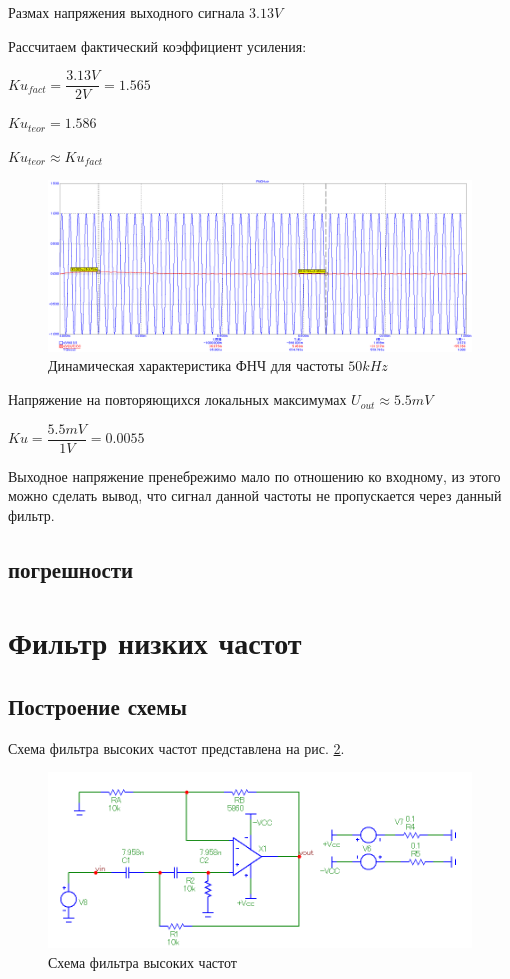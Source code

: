 \documentclass[a4paper,14pt]{article}
\begin{document}
Размах напряжения выходного сигнала $3.13V$

Рассчитаем фактический коэффициент усиления:

$Ku_{fact} = \dfrac{3.13V}{2V} = 1.565$

$Ku_{teor} = 1.586$

$Ku_{teor} \approx Ku_{fact}$

\begin{figure}[H]
	\centering
	\includegraphics[width=0.95\linewidth]{../imgs/FNCH/garm_50k_N}
	\caption{Динамическая характеристика ФНЧ для частоты $50kHz$}
	\label{fig:garm50kn}
\end{figure}

Напряжение на повторяющихся локальных максимумах $U_{out} \approx 5.5mV$

$Ku = \dfrac{5.5mV}{1V} = 0.0055$

Выходное напряжение пренебрежимо мало по отношению ко входному, из этого можно сделать вывод, что сигнал данной частоты не пропускается через данный фильтр.

\subsection{погрешности}




\section{Фильтр низких частот}

\subsection{Построение схемы}

Схема фильтра высоких частот представлена на рис. \ref{fig:shfvch}.


\begin{figure}[H]
	\centering
	\includegraphics[width=0.85\linewidth]{../imgs/FVCH/sh_fvch}
	\caption{Схема фильтра высоких частот}
	\label{fig:shfvch}
\end{figure}
\end{document}
